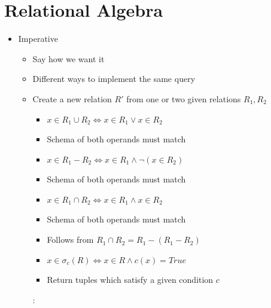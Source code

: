 \section{Relational Algebra}
\begin{itemize}
    \item Imperative
        \begin{itemize}
            \item Say how we want it
            \item Different ways to implement the same query
        \end{itemize}
        \begin{itemize}
            \item Create a new relation $R'$ from one or two given relations $R_1, R_2$
                \begin{itemize}
                    \item $x \in R_1 \cup R_2 \iff x \in R_1 \lor x \in R_2$
                    \item Schema of both operands must match
                \end{itemize}
                \begin{itemize}
                    \item $x \in R_1 - R_2 \iff x \in R_1 \land \neg (x \in R_2)$
                    \item Schema of both operands must match
                \end{itemize}
                \begin{itemize}
                    \item $x \in R_1 \cap R_2 \iff x \in R_1 \land x \in R_2$
                    \item Schema of both operands must match
                    \item Follows from $R_1 \cap R_2 = R_1 - (R_1 - R_2)$
                \end{itemize}
                \begin{itemize}
                    \item $x \in \sigma_c (R) \iff x \in R \land c(x) = True$
                    \item Return tuples which satisfy a given condition $c$
                \end{itemize}
            :
                \begin{itemize}

\end{itemize}
\end{itemize}
\end{itemize}
